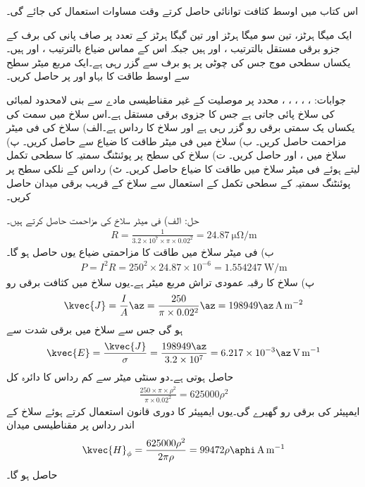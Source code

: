 اس کتاب میں اوسط کثافت توانائی حاصل کرتے  وقت مساوات  استعمال کی جائے گی۔

ایک میگا ہرٹز، تین سو میگا ہرٹز اور تین گیگا ہرٹز کے تعدد پر صاف پانی کی برف کے جزو برقی مستقل بالترتیب  ،  اور  ہیں جبکہ اس کے مماس ضیاع بالترتیب  ،   اور  ہیں۔ یکساں سطحی موج جس کی چوٹی  پر  ہو برف سے گزر رہی ہے۔ایک مربع میٹر سطح سے اوسط طاقت کا بہاو  اور  پر حاصل کریں۔

جوابات: ، ، ، ،  ،   
 محدد پر  موصلیت کے غیر مقناطیسی مادے سے بنی لامحدود لمبائی کی سلاخ پائی جاتی ہے جس کا جزوی برقی مستقل   ہے۔اس سلاخ میں  سمت  کی یکساں یک سمتی برقی رو گزر رہی ہے اور سلاخ کا رداس  ہے۔الف) سلاخ کی فی میٹر مزاحمت حاصل کریں۔ ب) سلاخ میں فی میٹر طاقت کا ضیاع  سے حاصل کریں۔ پ) سلاخ میں ،  اور  حاصل کریں۔ ت) سلاخ کی سطح پر پوئنٹنگ سمتیہ کا سطحی تکمل لیتے ہوئے فی میٹر سلاخ میں طاقت کا ضیاع حاصل کریں۔ ٹ) رداس  کے نلکی سطح پر پوئنٹنگ سمتیہ کے سطحی تکمل کے استعمال سے سلاخ کے قریب برقی میدان حاصل کریں۔

حل: الف) فی میٹر سلاخ کی مزاحمت حاصل کرتے ہیں۔ 
\begin{align*}
R=\frac{1}{3.2\times 10^7 \times \pi \times 0.02^2}=\SI{24.87}{\micro\ohm\per\meter}
\end{align*} 
ب) فی میٹر سلاخ میں طاقت کا مزاحمتی ضیاع یوں حاصل ہو گا۔
\begin{align*}
P=I^2 R=250^2 \times 24.87 \times 10^{-6}=\SI{1.554247}{\watt\per\meter}
\end{align*}
پ) سلاخ کا رقبہ عمودی تراش  مربع میٹر ہے۔یوں سلاخ میں کثافت برقی رو
\begin{align*}
\kvec{J}=\frac{I}{A} \az =\frac{250}{\pi \times 0.02^2} \az=198949 \az \, \si{\ampere\per\meter\squared}
\end{align*}
ہو گی جس سے سلاخ میں برقی شدت  سے 
\begin{align*}
\kvec{E}=\frac{\kvec{J}}{\sigma}=\frac{198949 \az}{3.2\times 10^7}=6.217\times 10^{-3} \az \, \si{\volt\per\meter}
\end{align*}
حاصل ہوتی ہے۔دو سنٹی میٹر سے کم رداس  کا دائرہ کل
\begin{align*}
\frac{250 \times \pi \times \rho^2}{\pi \times 0.02^2}=625000 \rho^2
\end{align*}
ایمپیئر کی برقی رو گھیرے گی۔یوں ایمپیئر کا دوری قانون استعمال کرتے ہوئے سلاخ کے اندر رداس  پر مقناطیسی میدان
\begin{align*}
\kvec{H}_{\phi}=\frac{625000 \rho^2}{2\pi \rho}=99472 \rho  \aphi \, \si{\ampere\per\meter}
\end{align*}
حاصل ہو گا۔

